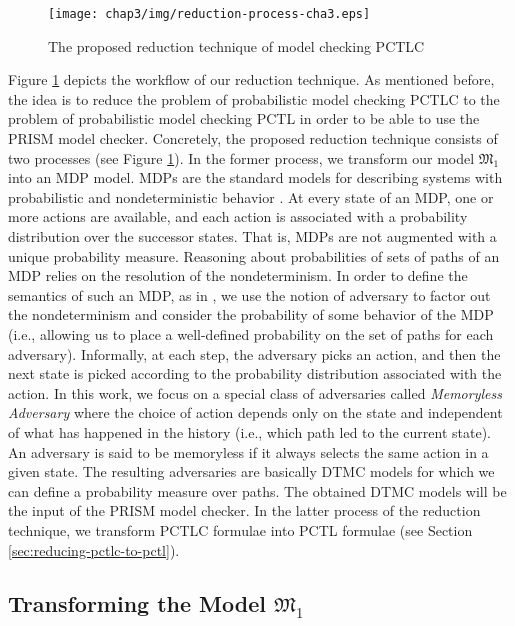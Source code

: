 \begin{figure}[!ht]
\begin{center}
\texttt{[image: chap3/img/reduction-process-cha3.eps]}
  \caption{The proposed reduction technique of model checking PCTLC}
\label{reduction-process}
\end{center}
\end{figure}

Figure \ref{reduction-process} depicts the workflow of our
reduction technique. As mentioned before, the idea is to reduce the problem of probabilistic model checking PCTLC to the problem of probabilistic
model checking PCTL in order to be able to use the PRISM model
checker. Concretely, the proposed reduction technique consists of
two processes (see Figure \ref{reduction-process}). In the former
process, we transform our model $\mathfrak{M_1}$ into an MDP model.
MDPs are the standard models for describing systems with
probabilistic and nondeterministic behavior \cite{Rutten2004}. At
every state of an MDP, one or more actions are available, and each
action is associated with a probability distribution over the
successor states. That is, MDPs are not augmented with a unique
probability measure. Reasoning about probabilities of sets of
paths of an MDP relies on the resolution of the nondeterminism. In
order to define the semantics of such an MDP, as in
\cite{Forejt2011}, we use the notion of adversary to factor out the nondeterminism and consider the probability of some
behavior of the MDP (i.e., allowing us to place a well-defined
probability on the set of paths for each adversary). Informally,
at each step, the adversary picks an action, and then the next
state is picked according to the probability distribution
associated with the action. In this work, we focus on a special
class of adversaries called \emph{Memoryless Adversary} where the
choice of action depends only on the state and independent of what
has happened in the history (i.e., which path led to the current
state). An adversary is said to be memoryless if it always selects
the same action in a given state. The resulting adversaries are
basically DTMC models for which we can define a probability
measure over paths. The obtained DTMC models will be the input of
the PRISM model checker. In the latter process of the reduction
technique, we transform PCTLC formulae into PCTL formulae (see
Section \ref{sec:reducing-pctlc-to-pctl}).



\subsection{Transforming the Model $\mathfrak{M_1}$} \label{sec:reducing-proposed-model}


